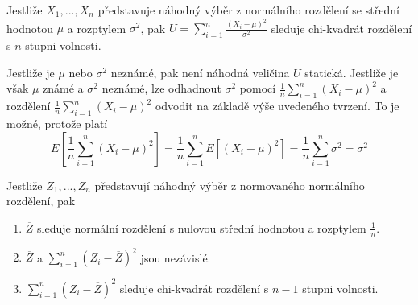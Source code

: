 \begin{corollary}
Jestliže $X_1, ..., X_n$ představuje náhodný výběr z normálního rozdělení se střední hodnotou $\mu$ a rozptylem $\sigma^2$, pak $U = \sum_{i = 1}^n \frac{(X_i - \mu)^2}{\sigma^2}$ sleduje chi-kvadrát rozdělení s $n$ stupni volnosti.
\end{corollary}

Jestliže je $\mu$ nebo $\sigma^2$ neznámé, pak není náhodná veličina $U$ statická. Jestliže je však $\mu$ známé a $\sigma^2$ neznámé, lze odhadnout $\sigma^2$ pomocí $\frac{1}{n} \sum_{i = 1}^n (X_i - \mu)^2$ a rozdělení $\frac{1}{n} \sum_{i = 1}^n (X_i - \mu)^2$ odvodit na základě výše uvedeného tvrzení. To je možné, protože platí
\begin{equation*}
E \left[\frac{1}{n} \sum_{i = 1}^n (X_i - \mu)^2 \right] = \frac{1}{n} \sum_{i = 1}^n E[(X_i - \mu)^2] = \frac{1}{n} \sum_{i = 1}^n \sigma^2 = \sigma^2
\end{equation*}

\begin{theorem}
Jestliže $Z_1, ..., Z_n$ představují náhodný výběr z normovaného normálního rozdělení, pak
\begin{enumerate}
\item $\overline{Z}$ sleduje normální rozdělení s nulovou střední hodnotou a rozptylem $\frac{1}{n}$.
\item $\overline{Z}$ a $\sum_{i = 1}^n(Z_i - \overline{Z})^2$ jsou nezávislé.
\item $\sum_{i = 1}^n (Z_i - \overline{Z})^2$ sleduje chi-kvadrát rozdělení s $n - 1$ stupni volnosti.
\end{enumerate}
\end{theorem}

